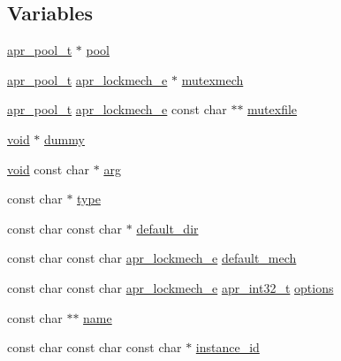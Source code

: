 \subsection*{Variables}
\begin{DoxyCompactItemize}
\item 
\hyperlink{structapr__pool__t}{apr\+\_\+pool\+\_\+t} $\ast$ \hyperlink{group__APACHE__CORE__MUTEX_ga8fea43b485988aa6df5dced9dddbe733}{pool}
\item 
\hyperlink{structapr__pool__t}{apr\+\_\+pool\+\_\+t} \hyperlink{group__apr__proc__mutex_ga75dd95a48a1e855a87b509b522746ed4}{apr\+\_\+lockmech\+\_\+e} $\ast$ \hyperlink{group__APACHE__CORE__MUTEX_ga2b93d746dbd53f3815877a7b19f89be1}{mutexmech}
\item 
\hyperlink{structapr__pool__t}{apr\+\_\+pool\+\_\+t} \hyperlink{group__apr__proc__mutex_ga75dd95a48a1e855a87b509b522746ed4}{apr\+\_\+lockmech\+\_\+e} const char $\ast$$\ast$ \hyperlink{group__APACHE__CORE__MUTEX_gaa4b7af5163be82f815eb2e47c2b4480e}{mutexfile}
\item 
\hyperlink{group__MOD__ISAPI_gacd6cdbf73df3d9eed42fa493d9b621a6}{void} $\ast$ \hyperlink{group__APACHE__CORE__MUTEX_ga99dc3b67257851cb91efea473083cd0f}{dummy}
\item 
\hyperlink{group__MOD__ISAPI_gacd6cdbf73df3d9eed42fa493d9b621a6}{void} const char $\ast$ \hyperlink{group__APACHE__CORE__MUTEX_gaf6517210150d97cd5cb8a17e3768770d}{arg}
\item 
const char $\ast$ \hyperlink{group__APACHE__CORE__MUTEX_gad6684d21de09ea5d0d54e7629c882107}{type}
\item 
const char const char $\ast$ \hyperlink{group__APACHE__CORE__MUTEX_ga56289591e4fc9deed24a16663299f5ea}{default\+\_\+dir}
\item 
const char const char \hyperlink{group__apr__proc__mutex_ga75dd95a48a1e855a87b509b522746ed4}{apr\+\_\+lockmech\+\_\+e} \hyperlink{group__APACHE__CORE__MUTEX_ga1a18ef0d888b24930ae6acf4619c2883}{default\+\_\+mech}
\item 
const char const char \hyperlink{group__apr__proc__mutex_ga75dd95a48a1e855a87b509b522746ed4}{apr\+\_\+lockmech\+\_\+e} \hyperlink{group__apr__platform_ga21ef1e35fd3ff9be386f3cb20164ff02}{apr\+\_\+int32\+\_\+t} \hyperlink{group__APACHE__CORE__MUTEX_gaa6c9d809037676d22aceaf5517a33faf}{options}
\item 
const char $\ast$$\ast$ \hyperlink{group__APACHE__CORE__MUTEX_gab18145d180c6041a6488264fd77d28ec}{name}
\item 
const char const char const char $\ast$ \hyperlink{group__APACHE__CORE__MUTEX_ga896069af53580a2c53639ce00152f9e8}{instance\+\_\+id}

\end{DoxyCompactItemize}
